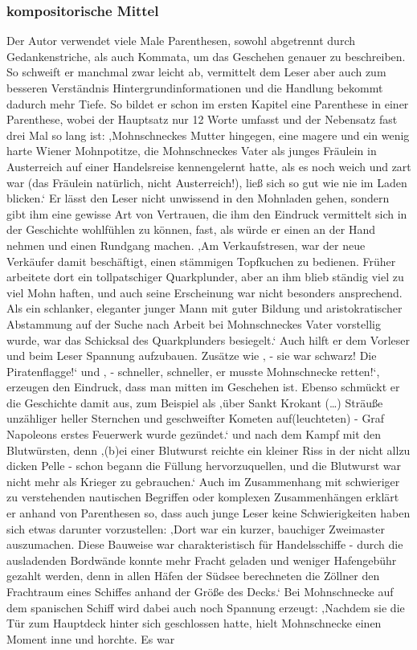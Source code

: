\subsubsection{kompositorische Mittel}

Der Autor verwendet viele Male Parenthesen, sowohl abgetrennt durch Gedankenstriche, als auch Kommata, um das Geschehen genauer zu beschreiben. So schweift er manchmal zwar leicht ab, vermittelt dem Leser aber auch zum besseren Verständnis Hintergrundinformationen und die Handlung bekommt dadurch mehr Tiefe. So bildet er schon im ersten Kapitel eine Parenthese in einer Parenthese, wobei der Hauptsatz nur 12 Worte umfasst und der Nebensatz fast drei Mal so lang ist:\cite[S.13]{pir} ‚Mohnschneckes Mutter hingegen, eine magere und ein wenig harte Wiener Mohnpotitze, die Mohnschneckes Vater als junges Fräulein in Austerreich  auf einer Handelsreise kennengelernt hatte, als es noch weich und zart war (das Fräulein natürlich, nicht Austerreich!), ließ sich so gut wie nie im Laden blicken.‘\cite[S.13]{pir} Er lässt  den Leser nicht unwissend in den Mohnladen gehen, sondern gibt ihm eine gewisse Art von Vertrauen, die ihm den Eindruck vermittelt sich in der Geschichte wohlfühlen zu können, fast, als würde er einen an der Hand nehmen und einen Rundgang machen. ‚Am Verkaufstresen, war der neue Verkäufer damit beschäftigt, einen stämmigen Topfkuchen zu bedienen. Früher arbeitete dort ein tollpatschiger Quarkplunder, aber an ihm blieb ständig viel zu viel Mohn haften, und auch seine Erscheinung war nicht besonders ansprechend. Als ein schlanker, eleganter junger Mann mit guter Bildung und aristokratischer Abstammung auf der Suche nach Arbeit bei Mohnschneckes Vater vorstellig wurde, war das Schicksal des Quarkplunders besiegelt.‘\cite[S.15]{pir} Auch hilft er dem Vorleser und beim Leser Spannung aufzubauen. Zusätze wie ‚ - sie war schwarz! Die Piratenflagge!‘\cite[S.28]{pir} und ‚ - schneller, schneller, er musste Mohnschnecke retten!‘,\cite[S.29]{pir} erzeugen den Eindruck, dass man mitten im Geschehen ist. Ebenso schmückt er die Geschichte damit aus, zum Beispiel als ‚über Sankt Krokant (…) Sträuße unzähliger heller Sternchen und geschweifter Kometen auf(leuchteten) - Graf Napoleons erstes Feuerwerk wurde gezündet.‘\cite[S.36]{pir} und nach dem Kampf mit den Blutwürsten, denn ‚(b)ei einer Blutwurst reichte ein kleiner Riss in der nicht allzu dicken Pelle - schon begann die Füllung hervorzuquellen, und die Blutwurst war nicht mehr als Krieger zu gebrauchen.‘ Auch im Zusammenhang mit schwieriger zu verstehenden nautischen Begriffen oder komplexen Zusammenhängen erklärt er anhand von  Parenthesen so, dass auch junge Leser keine Schwierigkeiten haben sich etwas darunter vorzustellen: ‚Dort war ein kurzer, bauchiger Zweimaster auszumachen. Diese Bauweise war charakteristisch für Handelsschiffe - durch die ausladenden Bordwände konnte mehr Fracht geladen und weniger Hafengebühr gezahlt werden, denn in allen Häfen der Südsee berechneten die Zöllner den Frachtraum eines Schiffes anhand der Größe des Decks.‘\cite[S.51]{pir} Bei Mohnschnecke auf  dem spanischen Schiff wird dabei auch noch Spannung erzeugt: ‚Nachdem sie die Tür zum Hauptdeck hinter sich geschlossen hatte, hielt Mohnschnecke einen Moment inne und horchte. Es war 